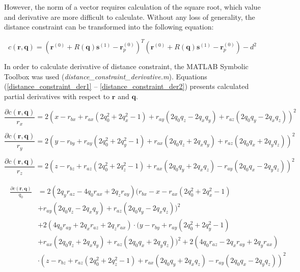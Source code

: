 However, the norm of a vector requires calculation of the square root, which value and derivative are more difficult to calculate. Without any loss of generality, the distance constraint can be transformed into the following equation:

\begin{equation}
	c(\bm{r}, \bm{q}) = \left( \bm{r}^{(0)} + R(\bm{q})\bm{s}^{(1)} - \bm{r}_p^{(0)} \right)^T \left( \bm{r}^{(0)} + R(\bm{q})\bm{s}^{(1)} - \bm{r}_p^{(0)} \right) - d^2
	\label{distance_constraint_fun}
\end{equation}

In order to calculate derivative of distance constraint, the MATLAB Symbolic Toolbox was used \mbox{(\textit{distance\_constraint\_derivative.m})}. Equations (\ref{distance_constraint_der1} -- \ref{distance_constraint_der2}) presents calculated partial derivatives with respect to $\bm{r}$ and $\bm{q}$.

\begin{equation}
	\frac{\partial c(\bm{r}, \bm{q})}{r_x} = 2(x - r_{bx} + r_{ax}(2q_0^2 + 2q_x^2 - 1) + r_{ay}(2q_0q_z - 2q_xq_y) + r_{az}(2q_0q_y - 2q_xq_z))^2 
	\label{distance_constraint_der1}
\end{equation}

\begin{equation}
	\frac{\partial c(\bm{r}, \bm{q})}{r_y} = 2(y - r_{by} + r_{ay}(2q_0^2 + 2q_y^2 - 1) + r_{ax}(2q_0q_z + 2q_xq_y) + r_{az}(2q_0q_x + 2q_yq_z))^2
\end{equation}

\begin{equation}
	\frac{\partial c(\bm{r}, \bm{q})}{r_z} = 2(z - r_{bz} + r_{az}(2q_0^2 + 2q_z^2 - 1) + r_{ax}(2q_0q_y + 2q_xq_z) - r_{ay}(2q_0q_x - 2q_yq_z))^2
\end{equation}

\begin{align}
\begin{split}
	\frac{\partial c(\bm{r}, \bm{q})}{q_0} &= 2(2q_yr_{az} - 4q_0r_{ax} + 2q_zr_{ay})(r_{bx} - x - r_{ax}(2q_0^2 + 2q_x^2 - 1)\\
	&+ r_{ay}(2q_0q_z - 2q_xq_y) + r_{az}(2q_0q_y - 2q_xq_z))^2\\
	&+ 2(4q_0r_{ay} +  2q_xr_{az} + 2q_zr_{ax}) \cdot(y - r_{by} + r_{ay}(2q_0^2 + 2q_y^2 - 1)\\
	&+ r_{ax}(2q_0q_z + 2q_xq_y) + r_{az}(2q_0q_x + 2q_yq_z))^2 + 2(4q_0r_{az} - 2q_xr_{ay} + 2q_yr_{ax})\\
	&\cdot(z - r_{bz} + r_{az}(2q_0^2 + 2q_z^2 - 1) + r_{ax}(2q_0q_y + 2q_xq_z) - r_{ay}(2q_0q_x - 2q_yq_z))^2
\end{split}
\end{align}

